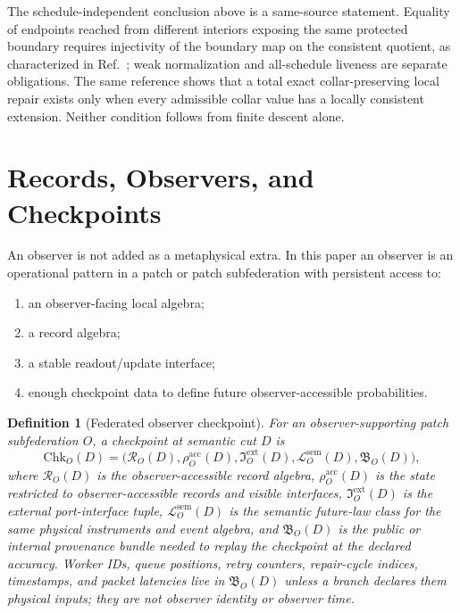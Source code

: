 \documentclass[11pt]{article}
\newtheorem{definition}[theorem]{Definition}
\theoremstyle{remark}
\theoremstyle{plain}
\begin{document}
The schedule-independent conclusion above is a same-source statement.  Equality of endpoints
reached from different interiors exposing the same protected boundary requires injectivity of the
boundary map on the consistent quotient, as characterized in
Ref.~\cite{observableNormalForms}; weak normalization and all-schedule liveness are separate
obligations.  The same reference shows that a total exact collar-preserving local repair exists
only when every admissible collar value has a locally consistent extension.  Neither condition
follows from finite descent alone.

\section{Records, Observers, and Checkpoints}

An observer is not added as a metaphysical extra. In this paper an observer is an operational
pattern in a patch or patch subfederation with persistent access to:
\begin{enumerate}[leftmargin=2em]
\item an observer-facing local algebra;
\item a record algebra;
\item a stable readout/update interface;
\item enough checkpoint data to define future observer-accessible probabilities.
\end{enumerate}

\begin{definition}[Federated observer checkpoint]
For an observer-supporting patch subfederation \(O\), a checkpoint at semantic cut \(D\) is
\[
\mathrm{Chk}_O(D)=
\bigl(
\mathcal R_O(D),
\rho_O^{\mathrm{acc}}(D),
\mathfrak I_O^{\mathrm{ext}}(D),
\mathcal L_O^{\mathrm{sem}}(D),
\mathfrak B_O(D)
\bigr),
\]
where \(\mathcal R_O(D)\) is the observer-accessible record algebra,
\(\rho_O^{\mathrm{acc}}(D)\) is the state restricted to observer-accessible records and visible
interfaces, \(\mathfrak I_O^{\mathrm{ext}}(D)\) is the external port-interface tuple,
\(\mathcal L_O^{\mathrm{sem}}(D)\) is the semantic future-law class for the same physical
instruments and event algebra, and \(\mathfrak B_O(D)\) is the public or internal provenance bundle
needed to replay the checkpoint at the declared accuracy. Worker IDs, queue positions, retry
counters, repair-cycle indices, timestamps, and packet latencies live in \(\mathfrak B_O(D)\)
unless a branch declares them physical inputs; they are not observer identity or observer time.
\end{definition}
\end{document}
